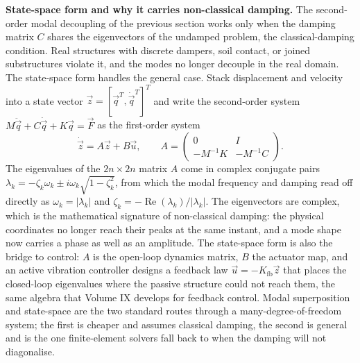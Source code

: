 \begin{mastery}
\textbf{State-space form and why it carries non-classical damping.} The
second-order modal decoupling of the previous section works only when
the damping matrix $C$ shares the eigenvectors of the undamped problem,
the classical-damping condition. Real structures with discrete dampers,
soil contact, or joined substructures violate it, and the modes no
longer decouple in the real domain. The state-space form handles the
general case. Stack displacement and velocity into a state vector
$\vec{z} = [\vec{q}^T, \dot{\vec{q}}^T]^T$ and write the second-order
system $M\ddot{\vec{q}} + C\dot{\vec{q}} + K\vec{q} = \vec{F}$ as the
first-order system
\[
\dot{\vec{z}} = A\vec{z} + B\vec{u}, \qquad
A = \begin{pmatrix} 0 & I \\ -M^{-1}K & -M^{-1}C \end{pmatrix}.
\]
The eigenvalues of the $2n\times 2n$ matrix $A$ come in complex
conjugate pairs $\lambda_k = -\zeta_k\omega_k \pm i\omega_k\sqrt{1 -
\zeta_k^2}$, from which the modal frequency and damping read off
directly as $\omega_k = |\lambda_k|$ and $\zeta_k = -\operatorname{Re}
(\lambda_k)/|\lambda_k|$. The eigenvectors are complex, which is the
mathematical signature of non-classical damping: the physical
coordinates no longer reach their peaks at the same instant, and a mode
shape now carries a phase as well as an amplitude. The state-space form
is also the bridge to control: $A$ is the open-loop dynamics matrix, $B$
the actuator map, and an active vibration controller designs a feedback
law $\vec{u} = -K_{\text{fb}}\vec{z}$ that places the closed-loop
eigenvalues where the passive structure could not reach them, the same
algebra that Volume IX develops for feedback control. Modal
superposition and state-space are the two standard routes through a
many-degree-of-freedom system; the first is cheaper and assumes
classical damping, the second is general and is the one finite-element
solvers fall back to when the damping will not diagonalise.
\end{mastery}

